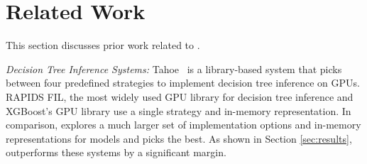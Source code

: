 \section{Related Work}
\label{Sec:Related}
This section discusses prior work related to \Treebeard{}.

\emph{Decision Tree Inference Systems:} 
Tahoe~\cite{Tahoe} is a library-based system that picks 
between four predefined strategies to implement decision tree inference on GPUs.
RAPIDS FIL\cite{FIL}, the most widely used GPU library for decision tree inference
and XGBoost's\cite{XGBoost} GPU library\cite{XGBGPU} 
use a single strategy and in-memory representation.
In comparison, \Treebeard{} explores a much larger set of implementation options and 
in-memory representations for models and picks the best.
As shown in Section \ref{sec:results}, \Treebeard{} outperforms
these systems by a significant margin.


